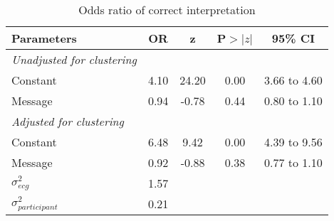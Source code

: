 \begin{table}[htbp]
\centering
\caption{Odds ratio of correct interpretation} 
\label{ormesgall}
\begin{tabular}{lcccc}
  \toprule
Parameters & OR & z & P$>$$|z|$ & 95\% CI \\ 
  \midrule
\textit{Unadjusted for clustering}  &  &  &  & \\ 
  Constant & 4.10 & 24.20 & 0.00 & 3.66 to 4.60 \\ 
  Message & 0.94 & -0.78 & 0.44 & 0.80 to 1.10 \\ 
  \midrule
  \textit{Adjusted for clustering} &  &  &  & \\ 
  Constant & 6.48 & 9.42 & 0.00 & 4.39 to 9.56 \\ 
  Message & 0.92 & -0.88 & 0.38 & 0.77 to 1.10 \\ 
  \midrule 
  $\sigma^2_{ecg}$ & 1.57 &  &  &  \\ 
  $\sigma^2_{participant}$ & 0.21 &  &  &  \\ 
   \bottomrule
\end{tabular}
\end{table}
